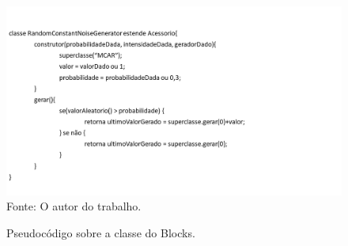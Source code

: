 \documentclass[
	12pt,				%
	openright,			%
	oneside,			%
	a4paper,			%
	english,			%
	brazil				%
	]{abntex2}
\begin{document}
		\begin{figure}[h!]
			\centering
			\caption{Pseudocódigo sobre a classe do Blocks.}
			\includegraphics[width=\linewidth]{./figures/prototipo/ConstantNoise.png}
			\label{fig:classeConstantNoise}
			\footnotesize Fonte: O autor do trabalho.
		\end{figure}
\end{document}
